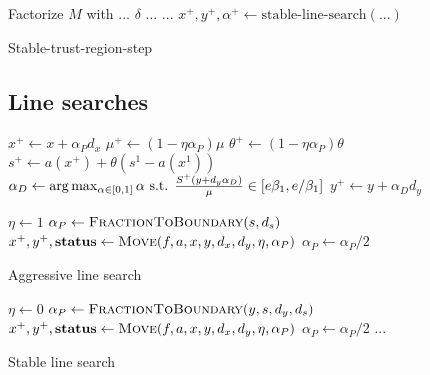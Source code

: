 \documentclass{article}
\begin{document}
\begin{algorithm}[H]
\begin{algorithmic}
\State Factorize $M$ with ... $\delta$ ...
\State ...
\EndIf
\State $x^{+}, y^{+}, \alpha^{+} \gets \text{stable-line-search}(...)$
\EndFor
\State {}
\EndFunction
\end{algorithmic}
\caption{Stable-trust-region-step}
\end{algorithm}

\subsection{Line searches}

\begin{algorithm}[H]
\begin{algorithmic}
\State $x^{+} \gets x + \alpha_{P} d_{x}$
\State $\mu^{+} \gets (1 - \eta \alpha_{P}) \mu$
\State $\theta^{+} \gets (1 - \eta \alpha_{P}) \theta$
\State $s^{+} \gets a(x^{+}) + \theta (  s^{1} - a(x^{1}) )$
\State $\alpha_{D} \gets \arg \max_{\alpha \in [0,1]} {\alpha} \text{ s.t. } \frac{S^{+} (y + d_{y} \alpha_{D})}{\mu} \in [ e \beta_{1}, e / \beta_{1} ] $
\State $y^{+} \gets y + \alpha_{D} d_{y}$
\EndFunction
\end{algorithmic}
\end{algorithm}


\begin{algorithm}[H]
\begin{algorithmic}
\State $\eta \gets 1$
\State $\alpha_{P} \gets \Call{FractionToBoundary}{s, d_{s} }$
\State $x^{+}, y^{+}, \status \gets \Call{Move}{\obj, \cons, x, y, d_{x}, d_{y}, \eta, \alpha_{P}}$
\State {}
\Else
\State $\alpha_{P} \gets \alpha_{P} / 2$
\EndIf
\EndFor
\EndFunction
\end{algorithmic}
\caption{Aggressive line search}
\end{algorithm}


\begin{algorithm}[H]
\begin{algorithmic}
\State $\eta \gets 0$
\State $\alpha_{P} \gets \Call{FractionToBoundary}{y, s, d_{y}, d_{s} }$
\State  $x^{+}, y^{+}, \status \gets \Call{Move}{\obj, \cons, x, y, d_{x}, d_{y}, \eta, \alpha_{P}}$
\If{$\status = \feasible$}
\State {}
\Else
\State 
\EndIf
\Else
\State $\alpha_{P} \gets \alpha_{P} /2$
\EndIf
\State ...
\EndFor
\EndFunction
\end{algorithmic}
\caption{Stable line search}
\end{algorithm}
\end{document}
